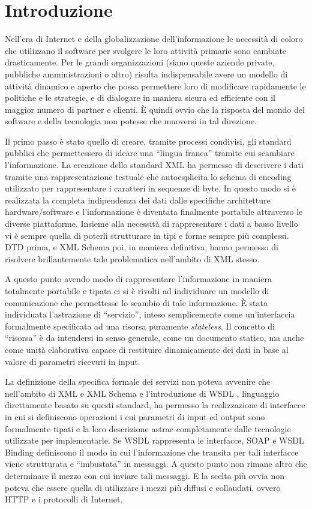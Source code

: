 \chapter{Introduzione}

Nell'era di Internet e della globalizzazione dell'informazione le necessità di
coloro che utilizzano il software per svolgere le loro attività primarie sono
cambiate drasticamente. Per le grandi organizzazioni (siano queste aziende
private, pubbliche amministrazioni o altro) risulta indispensabile avere un
modello di attività dinamico e aperto che possa permettere loro di modificare
rapidamente le politiche e le strategie, e di dialogare in maniera sicura ed
efficiente con il maggior numero di partner e clienti. \`E quindi ovvio che la
risposta del mondo del software e della tecnologia non potesse che muoversi in
tal direzione. 

Il primo passo è stato quello di creare, tramite processi condivisi, gli standard
pubblici che permettessero di ideare una ``lingua franca'' tramite cui scambiare
l'informazione. La creazione dello standard XML \cite{XML} ha permesso di
descrivere i dati tramite una rappresentazione testuale che autoesplicita lo
schema di encoding utilizzato per rappresentare i caratteri in sequenze di byte.
In questo modo si è realizzata la completa indipendenza dei dati dalle specifiche
architetture hardware/software e l'informazione è diventata finalmente portabile
attraverso le diverse piattaforme. Insieme alla necessità di rappresentare i dati
a basso livello vi è sempre quella di poterli strutturare in tipi e forme sempre
più complessi. DTD \cite{XML10} prima, e XML Schema \cite{XMLSchema} poi, in
maniera definitiva, hanno permesso di risolvere brillantemente tale problematica
nell'ambito di XML stesso.

A questo punto avendo modo di rappresentare l'informazione in maniera totalmente
portabile e tipata ci si è rivolti ad individuare un modello di comunicazione che
permettesse lo scambio di tale informazione. \`E stata individuata l'astrazione
di ``servizio'', inteso semplicemente come un'interfaccia formalmente specificata
ad una risorsa puramente \emph{stateless}. Il concetto di ``risorsa'' è da
intendersi in senso generale, come un documento statico, ma anche come unità
elaborativa capace di restituire dinamicamente dei dati in base al valore di
parametri ricevuti in input.

La definizione della specifica formale dei servizi non poteva avvenire che
nell'ambito di XML e XML Schema e l'introduzione di WSDL \cite{WSDL}, linguaggio
direttamente basato su questi standard, ha permesso la realizzazione di
interfacce in cui si definiscono operazioni i cui parametri di input ed output
sono formalmente tipati e la loro descrizione astrae completamente dalle
tecnologie utilizzate per implementarle. Se WSDL rappresenta le interfacce, SOAP
\cite{SOAP} e WSDL Binding \cite{WSDL} definiscono il modo in cui l'informazione
che transita per tali interfacce viene strutturata e ``imbustata'' in messaggi. A
questo punto non rimane altro che determinare il mezzo con cui inviare tali
messaggi. E la scelta più ovvia non poteva che essere quella di utilizzare i
mezzi più diffusi e collaudati, ovvero HTTP \cite{HTTP} \cite{HTTP1} e i
protocolli di Internet.

